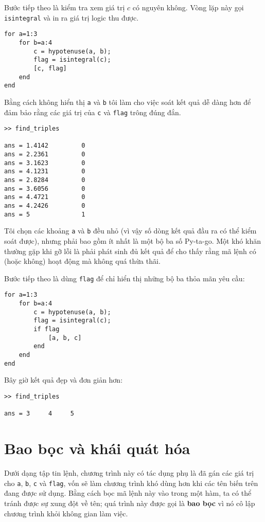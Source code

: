 \documentclass[12pt]{book}
\begin{document}
Bước tiếp theo là kiểm tra xem giá trị $c$ có nguyên không. Vòng lặp
này gọi {\tt isintegral} và in ra giá trị logic thu được.

\begin{verbatim}
for a=1:3
    for b=a:4
        c = hypotenuse(a, b);
        flag = isintegral(c);
        [c, flag]
    end
end
\end{verbatim}
%
Bằng cách không hiển thị {\tt a} và {\tt b} tôi làm cho việc soát
kết quả dễ dàng hơn để đảm bảo rằng các giá trị của {\tt c} và 
{\tt flag} trông đúng đắn.

\begin{verbatim}
>> find_triples

ans = 1.4142         0
ans = 2.2361         0
ans = 3.1623         0
ans = 4.1231         0
ans = 2.8284         0
ans = 3.6056         0
ans = 4.4721         0
ans = 4.2426         0
ans = 5              1
\end{verbatim}
%
Tôi chọn các khoảng {\tt a} và {\tt b} đều nhỏ (vì vậy số dòng
kết quả đầu ra có thể kiểm soát được), nhưng phải bao gồm
ít nhất là một bộ ba số Py-ta-go. Một khó khăn thường gặp khi
gỡ lỗi là phải phát sinh đủ kết quả để cho thấy rằng mã lệnh
có (hoặc không) hoạt động mà không quá thừa thãi.

Bước tiếp theo là dùng {\tt flag} để chỉ hiển thị những bộ ba
thỏa mãn yêu cầu:

\begin{verbatim}
for a=1:3
    for b=a:4
        c = hypotenuse(a, b);
        flag = isintegral(c);
        if flag
            [a, b, c]
        end
    end
end
\end{verbatim}
%
Bây giờ kết quả đẹp và đơn giản hơn:

\begin{verbatim}
>> find_triples

ans = 3     4     5
\end{verbatim}



\section{Bao bọc và khái quát hóa}

Dưới dạng tập tin lệnh, chương trình này có tác dụng phụ là đã gán các
giá trị cho {\tt a}, {\tt b}, {\tt c} và {\tt flag}, vốn sẽ làm 
chương trình khó dùng hơn khi các tên biến trên đang được sử dụng.
Bằng cách bọc mã lệnh này vào trong một hàm, ta có thể tránh được sự
xung đột về tên; quá trình này được gọi là {\bf bao bọc} vì nó 
cô lập chương trình khỏi không gian làm việc.
\end{document}
